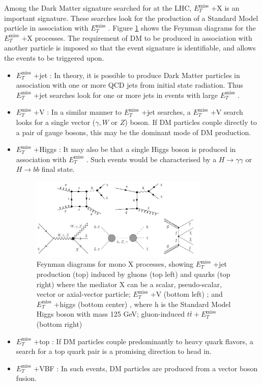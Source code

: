 \documentclass[12pt,a4paper,openright,twoside]{report}
\newcommand{\met}{$E_T^{\mathrm{miss}}$ }
\begin{document}
Among the Dark Matter signature searched for at the LHC, \met+X is an important signature. These searches look for the production of a Standard Model particle in association with \met. Figure \ref{fig:Mono_X} shows the Feynman diagrams for the \met+X processes. The requirement of DM to be produced in association with another particle is imposed so that the event signature is identifiable, and allows the events to be triggered upon.
\begin{itemize}

\item \met+jet : In theory, it is possible to produce Dark Matter particles in association with one or more QCD jets from initial state radiation. Thus \met+jet searches look for one or more jets in events with large \met.
\item \met+V : In a similar manner to \met+jet searches, a \met+V search looks for a single vector ($\gamma,W$ or $Z$) boson. If DM particles couple directly to a pair of gauge bosons, this may be the dominant mode of DM production.
\item \met+Higgs : It may also be that a single Higgs boson is produced in association with \met. Such events would be characterised by a $H\to\gamma\gamma$ or $H\to bb$ final state.
	
\begin{figure}[H]
\centering
\includegraphics[width=0.8\textwidth]{Mono_X.png}
\caption{Feynman diagrams for mono X processes, showing \met +jet production (top) induced by gluons (top left) and quarks (top right) \cite{mono_j} where the mediator X can be a scalar, pseudo-scalar, vector or axial-vector particle; \met +V (bottom left) \cite{mono_V}; and \met +higgs (bottom center) \cite{mono_h}, where h is the Standard Model Higgs boson with mass 125 GeV; gluon-induced $t\bar{t}+$\met (bottom right)}
\label{fig:Mono_X}
\end{figure}

\item \met+top : If DM particles couple predominantly to heavy quark flavors, a search for a top quark pair is a promising direction to head in.
\item \met+VBF : In such events, DM particles are produced from a vector boson fusion.
\end{itemize}
\end{document}
